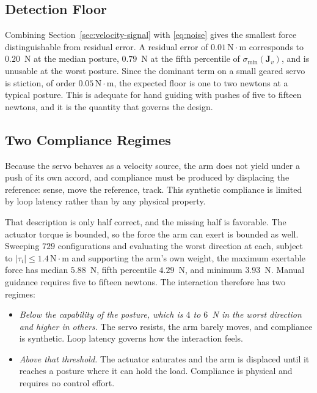 \documentclass{ieeeaccess}
\newcommand{\Jv}{\bm{J}_{\!v}}
\begin{document}
\subsection{Detection Floor}
Combining Section~\ref{sec:velocity-signal} with \eqref{eq:noise} gives the
smallest force distinguishable from residual error. A residual error of
$0.01\,\mathrm{N}\cdot\mathrm{m}$ corresponds to $0.20$~N at the median posture,
$0.79$~N at the fifth percentile of $\sigma_{\min}(\Jv)$, and is unusable at the
worst posture. Since the dominant term on a small geared servo is stiction, of
order $0.05\,\mathrm{N}\cdot\mathrm{m}$, the expected floor is one to two newtons
at a typical posture. This is adequate for hand guiding with pushes of five to
fifteen newtons, and it is the quantity that governs the design.

\subsection{Two Compliance Regimes}
\label{sec:velocity-regimes}
Because the servo behaves as a velocity source, the arm does not yield under a
push of its own accord, and compliance must be produced by displacing the
reference: sense, move the reference, track. This synthetic compliance is limited
by loop latency rather than by any physical property.

That description is only half correct, and the missing half is favorable. The
actuator torque is bounded, so the force the arm can exert is bounded as well.
Sweeping $729$ configurations and evaluating the worst direction at each,
subject to $|\tau_i|\le1.4\,\mathrm{N}\cdot\mathrm{m}$ and supporting the arm's own
weight, the maximum exertable force has median $5.88$~N, fifth percentile
$4.29$~N, and minimum $3.93$~N. Manual guidance requires five to fifteen newtons.
The interaction therefore has two regimes:

\begin{itemize}[leftmargin=*]
\item \emph{Below the capability of the posture, which is $4$ to $6$~N in the worst
direction and higher in others.} The servo resists, the arm barely moves,
and compliance is synthetic. Loop latency governs how the interaction feels.
\item \emph{Above that threshold.} The actuator saturates and the arm is displaced
until it reaches a posture where it can hold the load. Compliance is physical and
requires no control effort.
\end{itemize}
\end{document}
